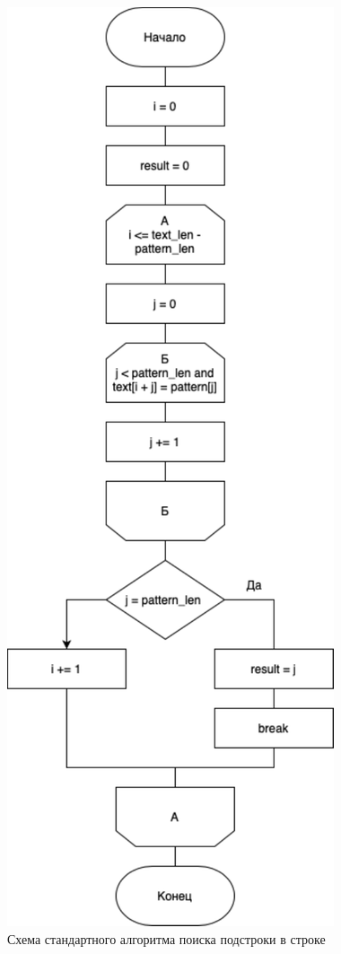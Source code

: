\begin{figure}[h]
    \centering
    \includegraphics[width=0.5\linewidth]{img/stand.pdf}
    \caption{Схема стандартного алгоритма поиска подстроки в строке}
    \label{img:stand}
\end{figure}

